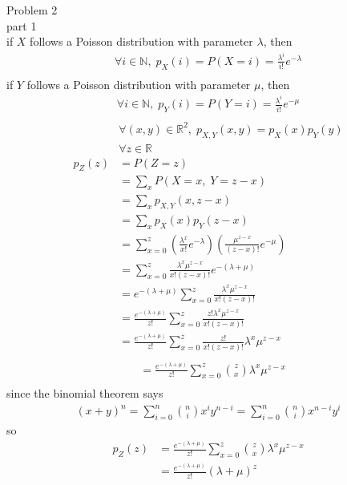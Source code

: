 \documentclass[12pt,border=4pt,multi]{article} %
\begin{document}
\newpage
\noindent
Problem 2\\
part 1\\
if $X$ follows a Poisson distribution with parameter $\lambda$, then
\begin{align*}
\forall i \in \mathbb{N}, \; p_X(i) = P(X = i) = \frac{\lambda^i}{i!}e^{-\lambda}\\
\end{align*}
if $Y$ follows a Poisson distribution with parameter $\mu$, then
\begin{align*}
\forall i \in \mathbb{N}, \; p_Y(i) = P(Y = i) = \frac{\lambda^i}{i!}e^{-\mu}\\
\end{align*}
\begin{align*}
&\forall (x, y) \in \mathbb{R}^2,\; p_{X, Y}(x, y) = p_{X}(x)p_{Y}(y)\\
&\forall z \in \mathbb{R}\\
p_Z(z) &= P(Z = z)\\
&= \sum_x P(X = x,\; Y = z - x)\\
&= \sum_x p_{X, Y}(x, z - x)\\
&= \sum_x p_{X}(x)p_{Y}(z - x)\\
&= \sum_{x = 0}^{z} \left(\frac{\lambda^x}{x!}e^{-\lambda}\right)\left(\frac{\mu^{z - x}}{(z - x)!}e^{-\mu}\right)\\
&= \sum_{x = 0}^{z} \frac{\lambda^x \mu^{z - x}}{x!(z - x)!}e^{-(\lambda + \mu)}\\
&= e^{-(\lambda + \mu)}\sum_{x = 0}^{z} \frac{\lambda^x \mu^{z - x}}{x!(z - x)!}\\
&= \frac{e^{-(\lambda + \mu)}}{z!}\sum_{x = 0}^{z} \frac{z!\lambda^x \mu^{z - x}}{x!(z - x)!}\\
&= \frac{e^{-(\lambda + \mu)}}{z!}\sum_{x = 0}^{z} \frac{z!}{x!(z - x)!}\lambda^x \mu^{z - x}\\
\end{align*}
\begin{align*}
&= \frac{e^{-(\lambda + \mu)}}{z!}\sum_{x = 0}^{z} \binom{z}{x}\lambda^x \mu^{z - x}\\
\end{align*}
since the binomial theorem says
\begin{align*}
(x + y)^n = \sum_{i = 0}^n \binom{n}{i} x^i y^{n - i} = \sum_{i = 0}^n \binom{n}{i} x^{n - i} y^{i}
\end{align*}
so
\begin{align*}
p_Z(z) &= \frac{e^{-(\lambda + \mu)}}{z!}\sum_{x = 0}^{z} \binom{z}{x}\lambda^x \mu^{z - x}\\
&= \boxed{\frac{e^{-(\lambda + \mu)}}{z!}(\lambda + \mu)^z}\\
\end{align*}
\end{document}
